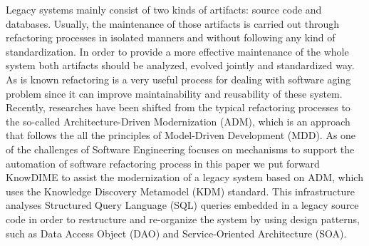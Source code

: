 Legacy systems mainly consist of two kinds of artifacts: source code and databases. Usually, the maintenance of those artifacts is carried out through refactoring processes in isolated manners and without following any kind of standardization. In order to provide a more effective maintenance of the whole system both artifacts should be analyzed, evolved jointly and standardized way. As is known refactoring is a very useful process for dealing with software aging problem since it can improve maintainability and reusability of these system. Recently, researches have been shifted from the typical refactoring processes to the so-called Architecture-Driven Modernization (ADM), which is an approach that follows the all the principles of Model-Driven Development (MDD). As one of the challenges of Software Engineering focuses on mechanisms to support the automation of software refactoring process in this paper we put forward KnowDIME to assist the modernization of a legacy system based on ADM, which uses the Knowledge Discovery Metamodel (KDM) standard. This infrastructure analyses Structured Query Language (SQL) queries embedded in a legacy source code in order to restructure and re-organize the system by using design patterns, such as Data Access Object (DAO) and Service-Oriented Architecture (SOA). 